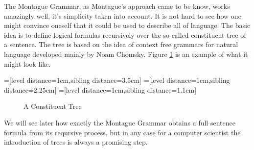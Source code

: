 \documentclass[12pt]{article}
\begin{document}
The Montague Grammar, as Montague's approach came to be know, works amazingly well, it's simplicity taken into account. It is not hard to see how one might convince oneself that it could be used to describe all of language. The basic idea is to define logical formulas recursively over the so called constituent tree of a sentence. The tree is based on the idea of context free grammars for natural language developed mainly by Noam Chomsky\cite{chomsky2002syntactic}. Figure \ref{fig:const_tree} is an example of what it might look like.

=[level distance=1cm,sibling distance=3.5cm]
=[level distance=1cm,sibling distance=2.25cm]
=[level distance=1cm,sibling distance=1.1cm]
\begin{figure}
\centering
{}
\caption{A Constituent Tree} \label{fig:const_tree}
\end{figure}

We will see later how exactly the Montague Grammar obtains a full sentence formula from its reqursive process, but in any case for a computer scientist the introduction of trees is always a promising step.
\end{document}
